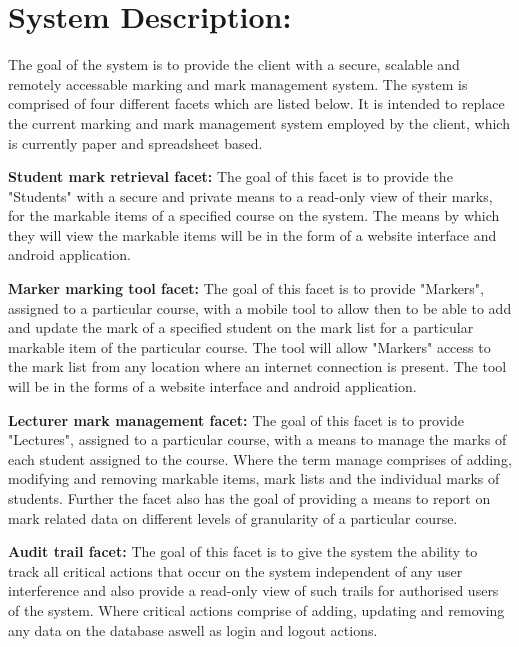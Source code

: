 \documentclass[12pt]{article}
\begin{document}
	
	\vspace{0.5in}
	
	\section{System Description:} %
	\vspace{0.2in}
	
	The goal of the system is to provide the client with a secure, scalable and remotely accessable marking and mark management system. The system is comprised of four different facets which are listed below. It is intended to replace the current marking and mark management system employed by the client, which is currently paper and spreadsheet based.
	
	\textbf{Student mark retrieval facet:}
	\vspace{0.1in}
	The goal of this facet is to provide the "Students" with a secure and private  means to a read-only view of their marks, for the markable items of a specified course on the system. The means by which they will view the markable items will be in the form of a website interface and android application.
	
	\textbf{Marker marking tool facet:}
	\vspace{0.1in}
	The goal of this facet is to provide "Markers", assigned to a particular course, with a mobile tool to allow then to be able to add and update the mark of a specified student on the mark list for a particular markable item of the particular course. The tool will allow "Markers" access to the mark list from any location where an internet connection is present. The tool will be in the forms of a website interface and android application.   	
	
	\textbf{Lecturer mark management facet:}
	\vspace{0.1in}
	The goal of this facet is to provide "Lectures", assigned to a particular course, with a means to manage the marks of each student assigned to the course. Where the term manage comprises of adding, modifying and removing markable items, mark lists and the individual marks of students. Further the facet also has the goal of providing a means to report on mark related data on different levels of granularity of a particular course.  
	
	\textbf{Audit trail facet:}
	\vspace{0.1in}
	The goal of this facet is to give the system the ability to track all critical actions that occur on the system independent of any user interference and also provide a read-only view of such trails for authorised users of the system. Where critical actions comprise of adding, updating and removing any data on the database aswell as login and logout actions.  
	
\end{document}
